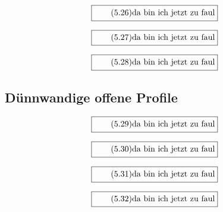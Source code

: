 \documentclass[11pt]{article}
\newcommand{\1}{ {\mathds{1}} }
\begin{document}
		\begin{equation}
			\boxed{
				\tag{5.26}
				\begin{split}
					\text{da bin ich jetzt zu faul}
				\end{split}
			}
		\end{equation}

		\begin{equation}
			\boxed{
				\tag{5.27}
				\begin{split}
					\text{da bin ich jetzt zu faul}
				\end{split}
			}
		\end{equation}
		
		\begin{equation}
			\boxed{
				\tag{5.28}
				\begin{split}
					\text{da bin ich jetzt zu faul}
				\end{split}
			}
		\end{equation}

		\subsection{Dünnwandige offene Profile}

		\begin{equation}
			\boxed{
				\tag{5.29}
				\begin{split}
					\text{da bin ich jetzt zu faul}
				\end{split}
			}
		\end{equation}

		\begin{equation}
			\boxed{
				\tag{5.30}
				\begin{split}
					\text{da bin ich jetzt zu faul}
				\end{split}
			}
		\end{equation}

		\begin{equation}
			\boxed{
				\tag{5.31}
				\begin{split}
					\text{da bin ich jetzt zu faul}
				\end{split}
			}
		\end{equation}

		\begin{equation}
			\boxed{
				\tag{5.32}
				\begin{split}
					\text{da bin ich jetzt zu faul}
				\end{split}
			}
		\end{equation}
\end{document}
